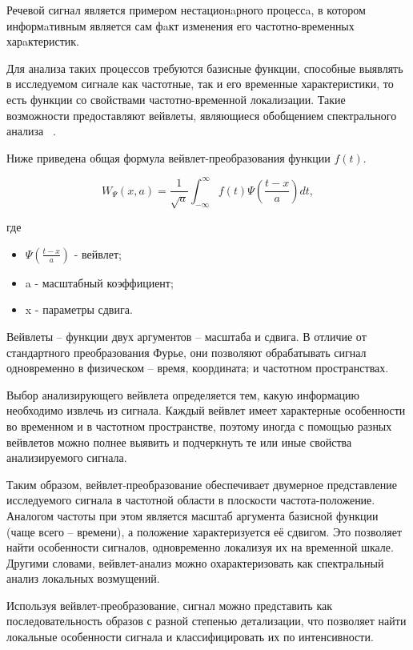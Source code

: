 \documentclass[utf8x, 14pt, oneside, a4paper]{article}
\begin{document}
	Речевой сигнал является примером нестационaрного процессa, в котором информaтивным является сам фaкт изменения его частотно-временных харaктеристик.

	Для анализа таких процессов требуются базисные функции, способные выявлять в исследуемом сигнале как частотные, так и его временные  характеристики, то есть функции со свойствами частотно-временной локализации. Такие возможности предоставляют вейвлеты, являющиеся обобщением спектрального анализа ~\cite{magistr}.
	
	Ниже приведена общая формула вейвлет-преобразования функции $f(t)$.
	
	\begin{equation}\label{eq:wavelet-main}
		W_{\Psi}(x, a) = \frac{1}{\sqrt{a}}\int_{-\infty}^{\infty}f(t)\Psi(\frac{t-x}{a})dt,
	\end{equation}
	
	где
	\begin{itemize}
		\item $\Psi(\frac{t-x}{a})$ - вейвлет;
		\item a - масштабный коэффициент;
		\item x - параметры сдвига.
	\end{itemize}
	
	Вейвлеты – функции двух аргументов – масштаба и сдвига. В отличие от стандартного преобразования Фурье, они позволяют обрабатывать сигнал одновременно в физическом – время, координата; и частотном пространствах. 
	
	Выбор анализирующего вейвлета определяется тем, какую информацию необходимо извлечь из сигнала. Каждый вейвлет имеет характерные особенности во временном и в частотном пространстве, поэтому иногда с помощью разных вейвлетов можно полнее выявить и подчеркнуть те или иные свойства анализируемого сигнала.

	Таким образом, вейвлет-преобразование обеспечивает двумерное представление исследуемого сигнала в частотной области в плоскости частота-\linebreak положение. Аналогом частоты при этом является масштаб аргумента базисной функции (чаще всего – времени), а положение характеризуется её сдвигом. Это позволяет найти особенности сигналов, одновременно локализуя их на временной шкале. Другими словами, вейвлет-анализ можно охарактеризовать как спектральный анализ локальных возмущений.
	
	Используя вейвлет-преобразование, сигнал можно представить как последовательность образов с разной степенью детализации, что позволяет найти локальные особенности сигнала и классифицировать их по интенсивности.
	
\end{document}
